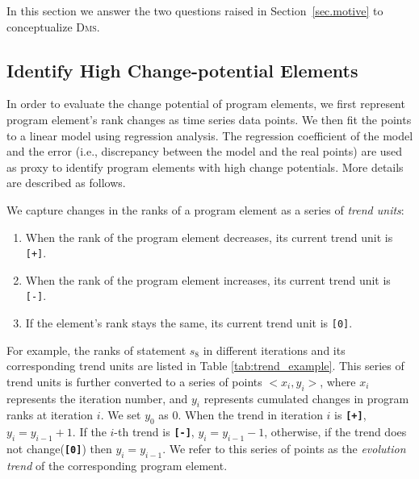 

In this section we answer the two questions raised in Section~\ref{sec.motive} to conceptualize \textsc{Dms}.

\subsection{Identify High Change-potential Elements}

In order to evaluate the change potential of program elements, we first represent program element's rank changes as time series data points. We then fit the points to a linear model using regression analysis. The regression coefficient of the model and the error (i.e., discrepancy between the model and the real points) are used as proxy to identify program elements with high change potentials. More details are described as follows.

\vspace{0.2cm}
 We capture changes in the ranks of a program element as a series of {\em trend units}:

\begin{enumerate}
    \setlength{\itemsep}{3pt}%
	\item When the rank of the program element decreases, its current trend unit is \texttt{[+]}.
	\item When the rank of the program element increases, its current trend unit is \texttt{[-]}.
	\item If the element's rank stays the same, its current trend unit is \texttt{[0]}.
\end{enumerate}

For example, the ranks of statement $s_{8}$ in different iterations and its corresponding trend units are listed in Table \ref{tab:trend_example}. This series of trend units is further converted to a series of points $<x_{i},y_{i}>$, where $x_{i}$ represents the iteration number, and $y_{i}$ represents cumulated changes in program ranks at iteration $i$. We set $y_{0}$ as 0. When the trend in iteration $i$ is {\bf \texttt{[+]}}, $y_{i} = y_{i-1} + 1$.
If the $i$-th trend is {\bf \texttt{[-]}}, $y_{i} = y_{i-1} - 1$, otherwise, if the trend does not change({\bf \texttt{[0]}}) then $y_{i} = y_{i-1}$. We refer to this series of points as the {\em evolution trend} of the corresponding program element.

